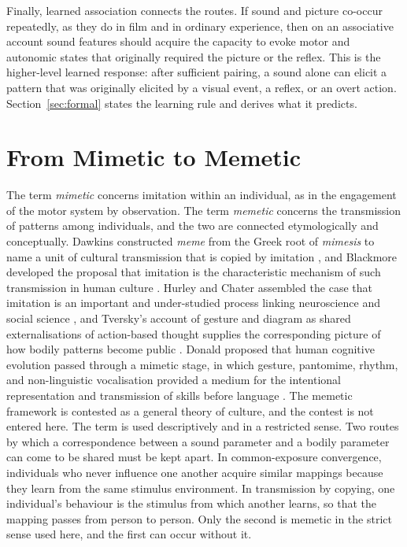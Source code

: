 \documentclass[11pt]{article}
\theoremstyle{plain}
\theoremstyle{definition}
\begin{document}
Finally, learned association connects the routes. If sound and picture co-occur repeatedly, as they do in film and in ordinary experience, then on an associative account sound features should acquire the capacity to evoke motor and autonomic states that originally required the picture or the reflex. This is the higher-level learned response: after sufficient pairing, a sound alone can elicit a pattern that was originally elicited by a visual event, a reflex, or an overt action. Section~\ref{sec:formal} states the learning rule and derives what it predicts.

\section{From Mimetic to Memetic}\label{sec:memetic}

The term \textit{mimetic} concerns imitation within an individual, as in the engagement of the motor system by observation. The term \textit{memetic} concerns the transmission of patterns among individuals, and the two are connected etymologically and conceptually. Dawkins constructed \textit{meme} from the Greek root of \textit{mimesis} to name a unit of cultural transmission that is copied by imitation \citep{dawkins1976}, and Blackmore developed the proposal that imitation is the characteristic mechanism of such transmission in human culture \citep{blackmore1999}. Hurley and Chater assembled the case that imitation is an important and under-studied process linking neuroscience and social science \citep{hurley2005}, and Tversky's account of gesture and diagram as shared externalisations of action-based thought supplies the corresponding picture of how bodily patterns become public \citep{tversky2019}. Donald proposed that human cognitive evolution passed through a mimetic stage, in which gesture, pantomime, rhythm, and non-linguistic vocalisation provided a medium for the intentional representation and transmission of skills before language \citep{donald1991}. The memetic framework is contested as a general theory of culture, and the contest is not entered here. The term is used descriptively and in a restricted sense. Two routes by which a correspondence between a sound parameter and a bodily parameter can come to be shared must be kept apart. In common-exposure convergence, individuals who never influence one another acquire similar mappings because they learn from the same stimulus environment. In transmission by copying, one individual's behaviour is the stimulus from which another learns, so that the mapping passes from person to person. Only the second is memetic in the strict sense used here, and the first can occur without it.
\end{document}
